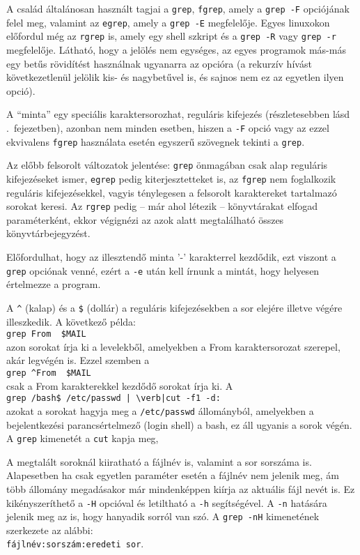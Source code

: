 A család általánosan használt tagjai a \texttt{grep}, \texttt{fgrep}, amely a
\texttt{grep -F} opciójának felel meg, valamint az \texttt{egrep}, amely a
\texttt{grep -E} megfelelője. Egyes linuxokon előfordul még az \texttt{rgrep}
is, amely egy shell szkript és a \texttt{grep -R} vagy \texttt{grep -r}
megfelelője. Látható, hogy a jelölés nem egységes, az egyes programok más-más
egy betűs rövidítést használnak ugyanarra az opcióra (a rekurzív hívást következetlenül
jelölik kis- és nagybetűvel is, és sajnos nem ez az egyetlen ilyen opció).

A ``minta'' egy speciális karaktersorozhat, reguláris kifejezés (részletesebben
lásd .\ fejezetben), azonban nem minden esetben, hiszen a
\texttt{-F} opció vagy az ezzel ekvivalens \texttt{fgrep} használata esetén
egyszerű szövegnek tekinti a \texttt{grep}.

Az előbb felsorolt változatok jelentése: \texttt{grep} önmagában csak alap
reguláris kifejezéseket ismer, \texttt{egrep} pedig kiterjesztetteket is, az
\texttt{fgrep} nem foglalkozik reguláris kifejezésekkel, vagyis ténylegesen a
felsorolt karaktereket tartalmazó sorokat keresi. Az \texttt{rgrep} pedig -- már
ahol létezik -- könyvtárakat elfogad paraméterként, ekkor végignézi az azok
alatt megtalálható összes könyvtárbejegyzést.

Előfordulhat, hogy az illesztendő minta '-' karakterrel kezdődik, ezt viszont a
\texttt{grep} opciónak venné, ezért a \texttt{-e} után kell írnunk a mintát,
hogy helyesen értelmezze a program.

A \verb|^| (kalap) és a \verb|$| (dollár) a reguláris kifejezésekben a sor
elejére illetve végére illeszkedik. A következő példa:\\
\utbeh\verb|grep From  $MAIL|\\
azon sorokat írja ki a levelekből, amelyekben a From karaktersorozat
szerepel, akár legvégén is. Ezzel szemben a\\
\utbeh\verb|grep ^From  $MAIL|\\
csak a From karakterekkel kezdődő sorokat írja ki. A\\
\utbeh\verb,grep /bash$ /etc/passwd | \verb|cut -f1 -d:,\\
azokat a sorokat hagyja meg a \texttt{/etc/passwd} állományból, amelyekben a
bejelentkezési parancsértelmező (login shell) a bash, ez áll ugyanis a sorok
végén. A \texttt{grep} kimenetét a \texttt{cut} kapja meg, 


A megtalált soroknál kiiratható a fájlnév is, valamint a sor sorszáma
is. Alapesetben ha csak egyetlen paraméter esetén
a fájlnév nem jelenik meg, ám több állomány megadásakor már mindenképpen kiírja
az aktuális fájl nevét is. Ez kikényszeríthető a \texttt{-H} opcióval és
letiltható a \texttt{-h} segítségével. A \texttt{-n} hatására jelenik meg az
is, hogy hanyadik sorról van szó. A \texttt{grep -nH} kimenetének szerkezete az
alábbi:\\
\utbeh\texttt{fájlnév:sorszám:eredeti sor}.

